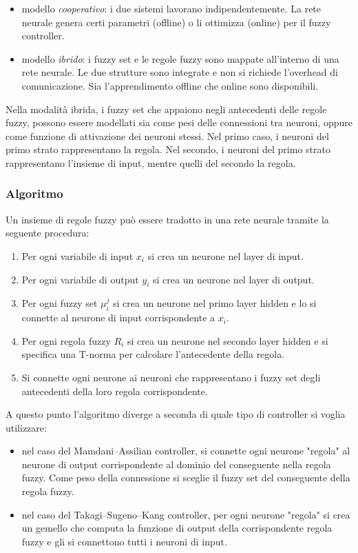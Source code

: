 \documentclass[10pt,a4paper]{article}
\begin{document}
\begin{itemize}
\item{modello \emph{cooperativo}: i due sistemi lavorano indipendentemente. La rete neurale genera certi parametri (offline) o li ottimizza (online) per il fuzzy controller.}
\item{modello \emph{ibrido}: i fuzzy set e le regole fuzzy sono mappate all'interno di una rete neurale. Le due strutture sono integrate e non si richiede l'overhead di comunicazione. Sia l'apprendimento offline che online sono disponibili.}
\end{itemize}

Nella modalità ibrida, i fuzzy set che appaiono negli antecedenti delle regole fuzzy, possono essere modellati sia come pesi delle connessioni tra neuroni, oppure come funzione di attivazione dei neuroni stessi. Nel primo caso, i neuroni del primo strato rappresentano la regola. Nel secondo, i neuroni del primo strato rappresentano l'insieme di input, mentre quelli del secondo la regola.

\subsubsection{Algoritmo}

Un insieme di regole fuzzy può essere tradotto in una rete neurale tramite la seguente procedura:

\begin{enumerate}
\item{Per ogni variabile di input $x_i$ si crea un neurone nel layer di input.}
\item{Per ogni variabile di output $y_i$ si crea un neurone nel layer di output.}
\item{Per ogni fuzzy set $\mu_i^j$ si crea un neurone nel primo layer hidden e lo si connette al neurone di input corrispondente a $x_i$.}
\item{Per ogni regola fuzzy $R_i$ si crea un neurone nel secondo layer hidden e si specifica una T-norma per calcolare l'antecedente della regola.}
\item{Si connette ogni neurone ai neuroni che rappresentano i fuzzy set degli antecedenti della loro regola corrispondente.}
\end{enumerate} 

A questo punto l'algoritmo diverge a seconda di quale tipo di controller si voglia utilizzare:

\begin{itemize}
\item{nel caso del Mamdani–Assilian controller, si connette ogni neurone "regola" al neurone di output corrispondente al dominio del conseguente nella regola fuzzy. Come peso della connessione si sceglie il fuzzy set del conseguente della regola fuzzy.}
\item{nel caso del Takagi–Sugeno–Kang controller, per ogni neurone "regola" si crea un gemello che computa la funzione di output della corrispondente regola fuzzy e gli si connettono tutti i neuroni di input.}
\end{itemize}
\end{document}
